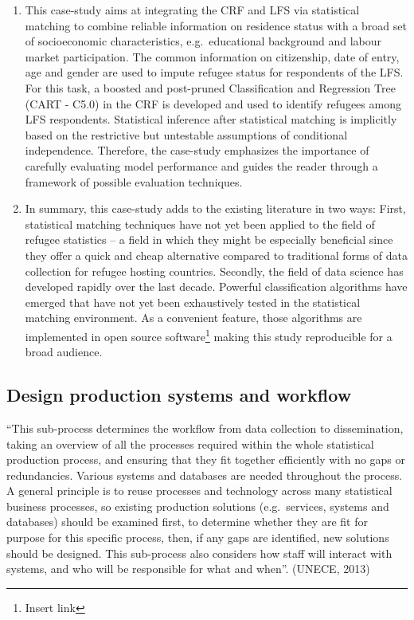 \documentclass[
]{article}
\begin{document}
\begin{enumerate}
\def\labelenumi{\arabic{enumi}.}
\setcounter{enumi}{265}
\item
  This case-study aims at integrating the CRF and LFS via statistical
  matching to combine reliable information on residence status with a
  broad set of socioeconomic characteristics, e.g.~educational
  background and labour market participation. The common information
  on citizenship, date of entry, age and gender are used to impute
  refugee status for respondents of the LFS. For this task, a boosted
  and post-pruned Classification and Regression Tree (CART - C5.0) in
  the CRF is developed and used to identify refugees among LFS
  respondents. Statistical inference after statistical matching is
  implicitly based on the restrictive but untestable assumptions of
  conditional independence. Therefore, the case-study emphasizes the
  importance of carefully evaluating model performance and guides the
  reader through a framework of possible evaluation techniques.
\item
  In summary, this case-study adds to the existing literature in two
  ways: First, statistical matching techniques have not yet been
  applied to the field of refugee statistics -- a field in which they
  might be especially beneficial since they offer a quick and cheap
  alternative compared to traditional forms of data collection for
  refugee hosting countries. Secondly, the field of data science has
  developed rapidly over the last decade. Powerful classification
  algorithms have emerged that have not yet been exhaustively tested
  in the statistical matching environment. As a convenient feature,
  those algorithms are implemented in open source software\footnote{Insert link} making
  this study reproducible for a broad audience.
\end{enumerate}

\hypertarget{design-production-systems-and-workflow-1}{%
\subsection{Design production systems and workflow}\label{design-production-systems-and-workflow-1}}

``This sub-process determines the workflow from data collection to
dissemination, taking an overview of all the processes required within
the whole statistical production process, and ensuring that they fit
together efficiently with no gaps or redundancies. Various systems and
databases are needed throughout the process. A general principle is to
reuse processes and technology across many statistical business
processes, so existing production solutions (e.g.~services, systems and
databases) should be examined first, to determine whether they are fit
for purpose for this specific process, then, if any gaps are identified,
new solutions should be designed. This sub-process also considers how
staff will interact with systems, and who will be responsible for what
and when''. (UNECE, 2013)
\end{document}
